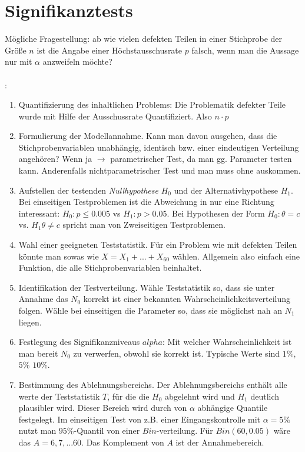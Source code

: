 \section{Signifikanztests}
Mögliche Fragestellung: ab wie vielen defekten Teilen in einer Stichprobe der Größe $n$ ist die Angabe einer Höchstausschusrate $p$ falsch, wenn man die Aussage nur mit $\alpha$ anzweifeln möchte?\\\\
:
\begin{enumerate}[leftmargin=*]
    \itemsep0em 
    \item Quantifizierung des inhaltlichen Problems: Die Problematik defekter Teile wurde mit Hilfe der Ausschussrate Quantifiziert. Also $n \cdot p$
    \item Formulierung der Modellannahme. Kann man davon ausgehen, dass die Stichprobenvariablen unabhängig, identisch bzw. einer eindeutigen Verteilung angehören? Wenn ja $\rightarrow$ parametrischer Test, da man gg. Parameter testen kann. Anderenfalls nichtparametrischer Test und man muss ohne auskommen.
    \item Aufstellen der testenden \emph{Nullhypothese} $H_0$ und der Alternativhypothese $H_1$. Bei einseitigen Testproblemen ist die Abweichung in nur eine Richtung interessant: $H_0: p \le 0.005$ vs $H_1: p > 0.05$. Bei Hypothesen der Form $H_0: \theta = c$ vs. $H_1 \theta \neq c$ spricht man von Zweiseitigen Testproblemen.
    \item Wahl einer geeigneten Teststatistik. Für ein Problem wie mit defekten Teilen könnte man sowas wie $X = X_1 + ... + X_60$ wählen. Allgemein also einfach eine Funktion, die alle Stichprobenvariablen beinhaltet.
    \item Identifikation der Testverteilung. Wähle Teststatistik so, dass sie unter Annahme das $N_0$ korrekt ist einer bekannten Wahrscheinlichkeitsverteilung folgen. Wähle bei einseitigen die Parameter so, dass sie möglichst nah an $N_1$ liegen.
    \item Festlegung des Signifikanzniveaus $alpha$: Mit welcher Wahrscheinlichkeit ist man bereit $N_0$ zu verwerfen, obwohl sie korrekt ist. Typische Werte sind $1\%$, $5\%$ $10\%$.
    \item Bestimmung des Ablehnungsbereichs. Der Ablehnungsbereichs enthält alle werte der Teststatistik $T$, für die die $H_0$ abgelehnt wird und $H_1$ deutlich plausibler wird. Dieser Bereich wird durch von $\alpha$ abhängige Quantile festgelegt. Im einseitigen Test von z.B. einer Eingangskontrolle mit $\alpha = 5\%$ nutzt man $95\%$-Quantil von einer $Bin$-verteilung. Für $Bin(60, 0.05)$ wäre das $A = {6, 7, ... 60}$. Das Komplement von $A$ ist der Annahmebereich.

\end{enumerate}
